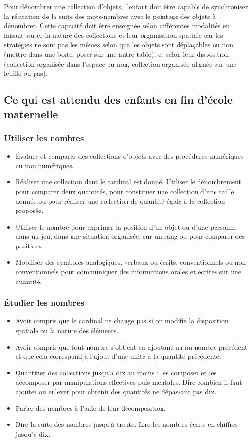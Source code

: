 Pour dénombrer une collection d’objets, l’enfant doit être capable de synchroniser la récitation de la suite des mots-nombres avec le pointage des objets à dénombrer. Cette capacité doit être enseignée selon différentes modalités en faisant varier la nature des collections et leur organisation spatiale car les stratégies ne sont pas les mêmes selon que les objets sont déplaçables ou non (mettre dans une boite, poser sur une autre table), et selon leur disposition (collection organisée dans l’espace ou non, collection organisée-alignée sur une feuille ou pas). 

\subsection{Ce qui est attendu des enfants en fin d’école maternelle}
\subsubsection{Utiliser les nombres}
\begin{itemize}
\item Évaluer et comparer des collections d’objets avec des procédures numériques ou non numériques.
\item Réaliser une collection dont le cardinal est donné. Utiliser le dénombrement pour comparer deux quantités, pour constituer une collection d’une taille donnée ou pour réaliser une collection de quantité égale à la collection proposée.
\item Utiliser le nombre pour exprimer la position d’un objet ou d’une personne dans un jeu, dans une situation organisée, sur un rang ou pour comparer des positions.
\item Mobiliser des symboles analogiques, verbaux ou écrits, conventionnels ou non conventionnels pour communiquer des informations orales et écrites sur une quantité. 
\end{itemize}

\subsubsection{Étudier les nombres}
\begin{itemize}
\item Avoir compris que le cardinal ne change pas si on modifie la disposition spatiale ou la nature des éléments.
\item Avoir compris que tout nombre s’obtient en ajoutant un au nombre précédent et que cela correspond à l’ajout d’une unité à la quantité précédente.
\item Quantifier des collections jusqu’à dix au moins ; les composer et les décomposer par manipulations effectives puis mentales. Dire combien il faut ajouter ou enlever pour obtenir des quantités ne dépassant pas dix.
\item Parler des nombres à l’aide de leur décomposition. 
\item Dire la suite des nombres jusqu’à trente. Lire les nombres écrits en chiffres jusqu’à dix.
\end{itemize}

